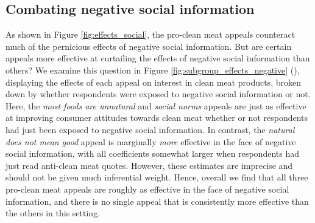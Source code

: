 \documentclass[12pt]{article}
\begin{document}

\subsection{Combating negative social information}

As shown in Figure \ref{fig:effects_social}, the pro-clean meat appeals counteract much of the pernicious effects of negative social information. But are certain appeals more effective at curtailing the effects of negative social information than others? We examine this question in Figure \ref{fig:subgroup_effects_negative} (), displaying the effects of each appeal on interest in clean meat products, broken down by whether respondents were exposed to negative social information or not. Here, the \textit{most foods are unnatural} and \textit{social norms} appeals are just as effective at improving consumer attitudes towards clean meat whether or not respondents had just been exposed to negative social information. In contrast, the \textit{natural does not mean good} appeal is marginally \textit{more} effective in the face of negative social information, with all coefficients somewhat larger when respondents had just read anti-clean meat quotes. However, these estimates are imprecise and should not be given much inferential weight. Hence, overall we find that all three pro-clean meat appeals are roughly as effective in the face of negative social information, and there is no single appeal that is consistently more effective than the others in this setting.


\end{document}
